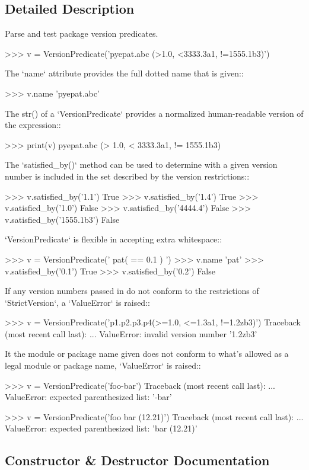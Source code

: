 \subsection{Detailed Description}
\begin{DoxyVerb}Parse and test package version predicates.

>>> v = VersionPredicate('pyepat.abc (>1.0, <3333.3a1, !=1555.1b3)')

The `name` attribute provides the full dotted name that is given::

>>> v.name
'pyepat.abc'

The str() of a `VersionPredicate` provides a normalized
human-readable version of the expression::

>>> print(v)
pyepat.abc (> 1.0, < 3333.3a1, != 1555.1b3)

The `satisfied_by()` method can be used to determine with a given
version number is included in the set described by the version
restrictions::

>>> v.satisfied_by('1.1')
True
>>> v.satisfied_by('1.4')
True
>>> v.satisfied_by('1.0')
False
>>> v.satisfied_by('4444.4')
False
>>> v.satisfied_by('1555.1b3')
False

`VersionPredicate` is flexible in accepting extra whitespace::

>>> v = VersionPredicate(' pat( ==  0.1  )  ')
>>> v.name
'pat'
>>> v.satisfied_by('0.1')
True
>>> v.satisfied_by('0.2')
False

If any version numbers passed in do not conform to the
restrictions of `StrictVersion`, a `ValueError` is raised::

>>> v = VersionPredicate('p1.p2.p3.p4(>=1.0, <=1.3a1, !=1.2zb3)')
Traceback (most recent call last):
  ...
ValueError: invalid version number '1.2zb3'

It the module or package name given does not conform to what's
allowed as a legal module or package name, `ValueError` is
raised::

>>> v = VersionPredicate('foo-bar')
Traceback (most recent call last):
  ...
ValueError: expected parenthesized list: '-bar'

>>> v = VersionPredicate('foo bar (12.21)')
Traceback (most recent call last):
  ...
ValueError: expected parenthesized list: 'bar (12.21)'\end{DoxyVerb}
 

\subsection{Constructor \& Destructor Documentation}
\mbox{\label{classsetuptools_1_1__distutils_1_1versionpredicate_1_1VersionPredicate_a50b7ef93717276fd4d7ea45efe206b1f}} 
